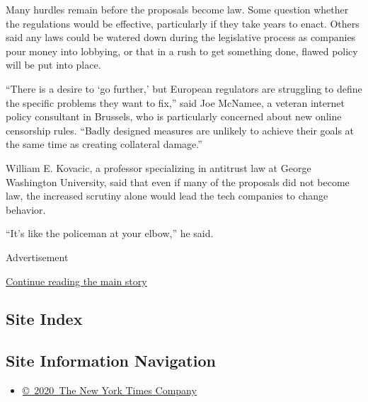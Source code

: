 Many hurdles remain before the proposals become law. Some question
whether the regulations would be effective, particularly if they take
years to enact. Others said any laws could be watered down during the
legislative process as companies pour money into lobbying, or that in a
rush to get something done, flawed policy will be put into place.

``There is a desire to `go further,' but European regulators are
struggling to define the specific problems they want to fix,'' said Joe
McNamee, a veteran internet policy consultant in Brussels, who is
particularly concerned about new online censorship rules. ``Badly
designed measures are unlikely to achieve their goals at the same time
as creating collateral damage.''

William E. Kovacic, a professor specializing in antitrust law at George
Washington University, said that even if many of the proposals did not
become law, the increased scrutiny alone would lead the tech companies
to change behavior.

``It's like the policeman at your elbow,'' he said.

Advertisement

\protect\hyperlink{after-bottom}{Continue reading the main story}

\hypertarget{site-index}{%
\subsection{Site Index}\label{site-index}}

\hypertarget{site-information-navigation}{%
\subsection{Site Information
Navigation}\label{site-information-navigation}}

\begin{itemize}
\tightlist
\item
  \href{https://help.nytimes3xbfgragh.onion/hc/en-us/articles/115014792127-Copyright-notice}{©~2020~The
  New York Times Company}
\end{itemize}

